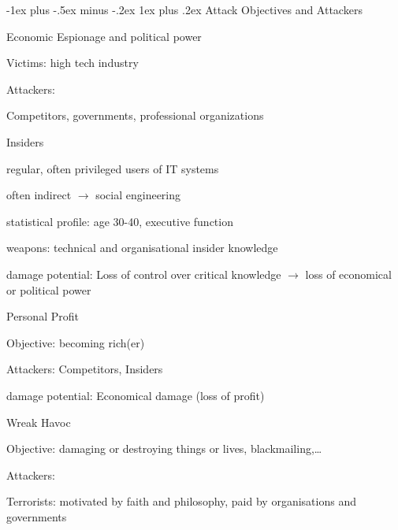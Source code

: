 \documentclass[a4paper]{article}
\makeatletter
\renewcommand{\subsubsection}{\@startsection{subsubsection}{3}{0mm}%
                {-1ex plus -.5ex minus -.2ex}%
                {1ex plus .2ex}%
                {\normalfont\small\bfseries}}
\makeatother
\begin{document}
\begin{multicols}{3}
    \subsubsection{Attack Objectives and Attackers}
    \begin{itemize*}
        \item Economic Espionage and political power
        \begin{itemize*}
            \item Victims: high tech industry
            \item Attackers:
            \begin{itemize*}
                \item Competitors, governments, professional organizations
                \item Insiders
                \item regular, often privileged users of IT systems
            \end{itemize*}
            \item often indirect $\rightarrow$ social engineering
            \item statistical profile: age 30-40, executive function
            \item weapons: technical and organisational insider knowledge
            \item damage potential: Loss of control over critical knowledge $\rightarrow$ loss of economical or political power
        \end{itemize*}
        \item Personal Profit
        \begin{itemize*}
            \item Objective: becoming rich(er)
            \item Attackers: Competitors, Insiders
            \item damage potential: Economical damage (loss of profit)
        \end{itemize*}
        \item Wreak Havoc
        \begin{itemize*}
            \item Objective: damaging or destroying things or lives, blackmailing,\dots
            \item Attackers:
            \begin{itemize*}
                \item Terrorists: motivated by faith and philosophy, paid by organisations and governments

\end{itemize*}
\end{itemize*}
\end{itemize*}
\end{multicols}
\end{document}
